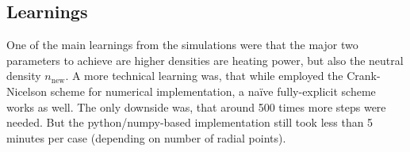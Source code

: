 

\subsection{Learnings}

One of the main learnings from the simulations were that the major two parameters to achieve are higher densities are heating power, but also the neutral density $n_\mathrm{new}$.
A more technical learning was, that while \cite{birkenmaierModeling2008} employed the Crank-Nicelson scheme for numerical implementation, a naïve fully-explicit scheme works as well.
The only downside was, that around 500 times more steps were needed.
But the python/numpy-based implementation still took less than 5 minutes per case (depending on number of radial points).
